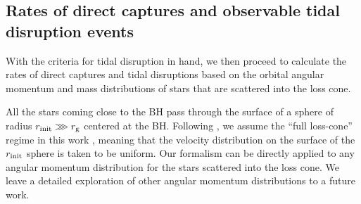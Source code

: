 \documentclass[useAMS,usenatbib]{mn2e}
\def\rg{r_{\rm g}}
\def\rinit{r_{\rm init}}
\def\Lcapt{L_{\rm capt}}
\def\LTD{L_{\rm TD}}
\def\GammaTDE{\Gamma_{\rm TDE}}
\def\Gammacapt{\Gamma_{\rm capt}}
\begin{document}
\subsection{Rates of direct captures and observable tidal disruption events}\label{sec:TDE_capture_rates}


With the criteria for tidal disruption in hand, we then proceed to calculate the rates of direct captures and tidal disruptions based on the orbital angular momentum and mass distributions of stars that are scattered into the loss cone. 



All the stars coming close to the BH pass through the surface of a sphere of radius $\rinit\ggg \rg$ centered at the BH. Following \citet{Kesden2012}, we assume the ``full loss-cone'' regime in this work \citep[as also adopted by][]{Coughlin2022a}, meaning that the velocity distribution on the surface of the $\rinit$ sphere is taken to be uniform. Our formalism can be directly applied to any angular momentum distribution for the stars scattered into the loss cone. We leave a detailed exploration of other angular momentum distributions \citep[e.g., allowing a certain fraction of galaxies to be in the ``empty loss-cone'' regime, see][]{stone16_TDE_rate} to a future work.
\end{document}
